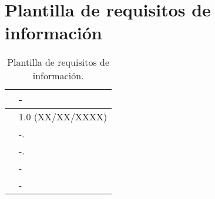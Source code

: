 \section{Plantilla de requisitos de información}

\begin{table}[H]
\begin{center}
\begin{tabular}{|p{3cm}|p{10cm}|} \hline
\centering {\bf IRQ-XX} & -  \\ \hline\hline
\centering {\bf Versión} & 1.0 (XX/XX/XXXX) \\ \hline
\centering {\bf Descripción} &  -. \\ \hline
\centering {\bf Datos específicos} &  -. \\ \hline
\centering {\bf Importancia} & - \\ \hline
\centering {\bf Urgencia} & - \\ \hline
\end{tabular}
\caption{Plantilla de requisitos de información.}
\label{enlaceIRQX}
\end{center}
\end{table}